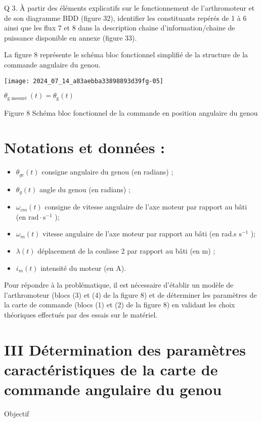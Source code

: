 Q 3. À partir des éléments explicatifs sur le fonctionnement de l'arthromoteur et de son diagramme BDD (figure 32), identifier les constituants repérés de 1 à 6 ainsi que les flux 7 et 8 dans la description chaine d'information/chaine de puissance disponible en annexe (figure 33).

La figure 8 représente le schéma bloc fonctionnel simplifié de la structure de la commande angulaire du genou.

\begin{center}
\texttt{[image: 2024\_07\_14\_a83aebba33898893d39fg-05]}
\end{center}

$\theta_{\mathrm{g} \text { mesuré }}(t)=\theta_{\mathrm{g}}(t)$

Figure 8 Schéma bloc fonctionnel de la commande en position angulaire du genou

\section*{Notations et données :}
\begin{itemize}
  \item $\theta_{g c}(t)$ consigne angulaire du genou (en radians) ;

  \item $\theta_{g}(t)$ angle du genou (en radians) ;

  \item $\omega_{c m}(t)$ consigne de vitesse angulaire de l'axe moteur par rapport au bâti (en $\mathrm{rad} \cdot \mathrm{s}^{-1}$ );

  \item $\omega_{m}(t)$ vitesse angulaire de l'axe moteur par rapport au bâti (en rad.s $\mathrm{s}^{-1}$ );

  \item $\lambda(t)$ déplacement de la coulisse 2 par rapport au bâti (en m) ;

  \item $i_{m}(t)$ intensité du moteur (en A).

\end{itemize}

Pour répondre à la problématique, il est nécessaire d'établir un modèle de l'arthromoteur (blocs (3) et (4) de la figure 8) et de déterminer les paramètres de la carte de commande (blocs (1) et (2) de la figure 8) en validant les choix théoriques effectués par des essais sur le matériel.

\section*{III Détermination des paramètres caractéristiques de la carte de commande angulaire du genou}
Objectif

